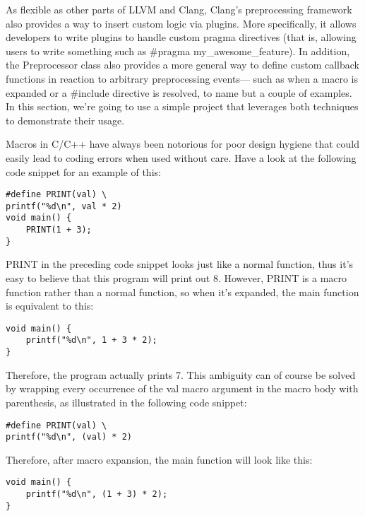 
As flexible as other parts of LLVM and Clang, Clang's preprocessing framework also provides a way to insert custom logic via plugins. More specifically, it allows developers to write plugins to handle custom pragma directives (that is, allowing users to write something such as \#pragma my\_awesome\_feature). In addition, the Preprocessor class also provides a more general way to define custom callback functions in reaction to arbitrary preprocessing events— such as when a macro is expanded or a \#include directive is resolved, to name but a couple of examples. In this section, we're going to use a simple project that leverages both techniques to demonstrate their usage.


Macros in C/C++ have always been notorious for poor design hygiene that could easily lead to coding errors when used without care. Have a look at the following code snippet for an example of this:

\begin{lstlisting}[style=styleCXX]
#define PRINT(val) \
printf("%d\n", val * 2)
void main() {
	PRINT(1 + 3);
}
\end{lstlisting}

PRINT in the preceding code snippet looks just like a normal function, thus it's easy to believe that this program will print out 8. However, PRINT is a macro function rather than a normal function, so when it's expanded, the main function is equivalent to this:

\begin{lstlisting}[style=styleCXX]
void main() {
	printf("%d\n", 1 + 3 * 2);
}
\end{lstlisting}

Therefore, the program actually prints 7. This ambiguity can of course be solved by wrapping every occurrence of the val macro argument in the macro body with parenthesis, as illustrated in the following code snippet:

\begin{lstlisting}[style=styleCXX]
#define PRINT(val) \
printf("%d\n", (val) * 2)
\end{lstlisting}

Therefore, after macro expansion, the main function will look like this:

\begin{lstlisting}[style=styleCXX]
void main() {
	printf("%d\n", (1 + 3) * 2);
}
\end{lstlisting}

